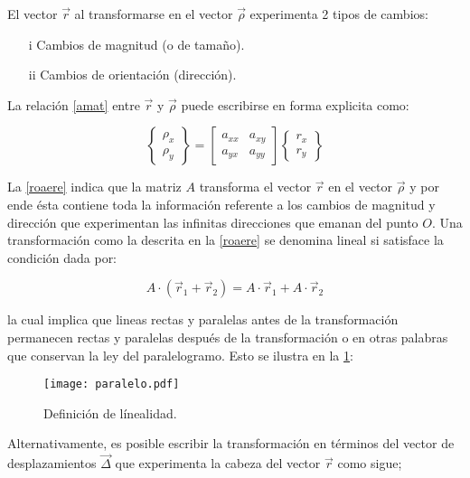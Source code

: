 \documentclass[../notas medios.tex]{subfiles}
\begin{document}
El vector $\vec{r}$ al transformarse en el vector $\vec{\rho}$ experimenta 2 tipos de cambios:

\begin{itemize}
\item[i] Cambios de magnitud (o de tamaño).
\item[ii] Cambios de orientación (dirección). 
\end{itemize}

La relación \cref{amat} entre $\vec{r}$ y $\vec{\rho}$ puede escribirse en forma explicita como:

\begin{equation}
\left\{ {\begin{array}{*{20}{c}}
{{\rho _x}}\\
{{\rho _y}}
\end{array}} \right\} = \left[ {\begin{array}{*{20}{c}}
{{a_{xx}}}&{{a_{xy}}}\\
{{a_{yx}}}&{{a_{yy}}}
\end{array}} \right]\left\{ {\begin{array}{*{20}{c}}
{{r_x}}\\
{{r_y}}
\end{array}} \right\}
\label{roaere}
\end{equation}

La \cref{roaere} indica que la matriz $A$ transforma el vector $\vec{r}$ en el vector $\vec{\rho}$ y por ende ésta contiene toda la información referente a los cambios de magnitud y dirección que experimentan las infinitas direcciones que emanan del punto $O$. Una transformación como la descrita en la \cref{roaere} se denomina lineal si satisface la condición dada por:

\begin{equation}
A \cdot \left( {{{\vec r}_1} + {{\vec r}_2}} \right) = A \cdot {{\vec r}_1} + A \cdot {{\vec r}_2}
\label{lineal}
\end{equation}

la cual implica que lineas rectas y paralelas antes de la transformación permanecen rectas y paralelas después de la transformación o en otras palabras que conservan la ley del paralelogramo. Esto se ilustra en la \cref{paralelo}:

\begin{figure}[H]
\centering
	\texttt{[image: paralelo.pdf]}
	\caption{Definición de línealidad.}
	\label{paralelo}
\end{figure}

Alternativamente, es posible escribir la transformación en términos del vector de desplazamientos ${\vec \Delta }$  que experimenta la cabeza del vector $\vec{r}$ como sigue;  
\end{document}
